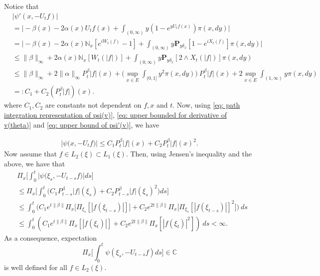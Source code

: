 \documentclass[12pt]{amsart}
\theoremstyle{plain}
\theoremstyle{definition}
\numberwithin{equation}{section}
\begin{document}
    Notice that
\begin{equation}
\label{eq: upper bound of psi'(v)}
\begin{split}
    &|\psi'(x, -U_tf)|
    \\&= \Big| -\beta(x)- 2\alpha(x) U_tf(x)+ \int_{(0,\infty)} y (1- e^{y U_tf(x)} ) \pi(x,dy)\Big|
    \\&= \Big| - \beta(x)- 2\alpha(x)\mathbb N_x[e^{i W_{t}(f)} - 1]  + \int_{(0,\infty)} y \mathbf P_{y \delta_x}[1-e^{i X_{t}(f)}] \pi(x,dy) \Big|
\\ &\leq \|\beta\|_\infty + 2\alpha(x)\mathbb N_x[W_t(|f|)]+ \int_{(0,\infty)} y\mathbf P_{y\delta_x}[2\wedge X_t(|f|)] \pi(x,dy)
\\ &\leq \|\beta\|_\infty + 2\|\alpha\|_\infty  P^\beta_t |f|(x) + \Big(\sup_{x\in E}\int_{(0,1]}y^2 \pi(x,dy)\Big)~P^\beta_t |f|(x) + 2\sup_{x\in E}\int_{(1,\infty)} y \pi(x,dy)
\\ &=: C_1 + C_2(P^\beta_t |f|)(x).
\end{split}
\end{equation}
    where $C_1, C_2$ are constants not dependent on $f,x$ and $t$.
    Now, using \eqref{eq: path integration representation of psi(v)}, \eqref{eq: upper bounded for derivative of v(theta)} and \eqref{eq: upper bound of psi'(v)}, we have

\begin{align}
\label{eq: upper bound of psi(v)}
    \big|\psi\big(x,-U_tf\big)\big|
    \leq C_1 P^\beta_t |f|(x)+C_2 P^\beta_t |f| (x)^2.
\end{align}
    Now assume that $f \in L_2(\xi) \subset L_1(\xi)$.
    Then, using Jensen's inequality and the above, we have that
\begin{align}
\label{eq: domination of psi(v)}
    &\Pi_x\Big[\int_0^t \big|\psi \big(\xi_s,-U_{t-s}f\big)\big|ds\Big]
    \\&\leq \Pi_x\Big[\int_0^t \big(C_1 P_{t-s}^\beta|f|(\xi_s)+C_2 P_{t-s}^\beta|f|(\xi_s)^2\big)ds\Big]
    \\ &\leq \int_0^t \big(C_1 e^{t\|\beta\|}\Pi_x \big[ \Pi_{\xi_s}[|f(\xi_{t-s})|] \big]+C_2 e^{2t\|\beta\|}\Pi_x \big[ \Pi_{\xi_s}[|f (\xi_{t-s})|]^2 \big]\big)~ds
    \\ &\leq \int_0^t (C_1 e^{t\|\beta\|}\Pi_x [ |f(\xi_{t})|]+C_2e^{2t\|\beta\|}\Pi_x [ |f (\xi_{t})|^2 ])~ds < \infty.
\end{align}
	As a consequence, expectation
\[
     \Pi_x\Big[\int_0^t \psi(\xi_s,-U_{t-s}f)ds\Big]
    \in \mathbb C
\]
    is well defined for all $f\in L_2(\xi)$.
\end{document}
